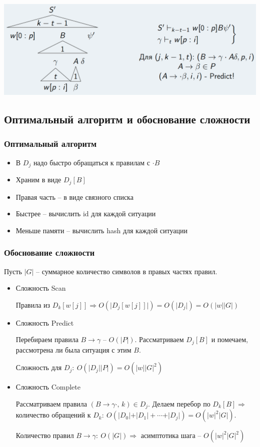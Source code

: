 \documentclass[a4paper,12pt]{article}
\theoremstyle{plain}
\theoremstyle{definition}
\theoremstyle{remark}
\begin{document}
\begin{itemize}
\begin{enumerate}
		            \includegraphics[scale=0.4]{assets/FullERli3.png}
	      \end{enumerate}
\end{itemize}

\subsection{Оптимальный алгоритм и обоснование сложности}
\subsubsection*{Оптимальный алгоритм}
\begin{itemize}
	\item В $D_j$ надо быстро обращаться к правилам с $\cdot B$
	\item Храним в виде $D_j[B]$
	\item Правая часть -- в виде связного списка
	\item Быстрее -- вычислить id для каждой ситуации
	\item Меньше памяти -- вычислить hash для каждой ситуации
\end{itemize}

\subsubsection*{Обоснование сложности}
Пусть $\vert G\vert$ -- суммарное количество символов в правых частях правил.

\begin{itemize}
	\item Сложность Scan

	      Правила из $D_k[w[j]] \Rightarrow O(\vert D_j[w[j]]\vert) = O(\vert D_j\vert) = O(\vert w\vert\vert G\vert)$

	\item Сложность Predict

	      Перебираем правила $B \to \gamma$ -- $O(\vert P\vert)$. Рассматриваем $D_j[B]$ и помечаем, рассмотрена ли была ситуация с этим $B$.

	      Сложность для $D_j :\: O(\vert D_j\vert\vert P\vert) = O(\vert w\vert\vert G\vert^2)$
	\item Сложность Complete

	      Рассматриваем правила $(B \to \gamma\cdot,\, k) \in D_j$. Делаем перебор по $D_k[B] \Rightarrow$ количество обращений к $D_k :\: O(\vert D_0\vert + \vert D_1\vert + \cdots + \vert D_j\vert) = O(\vert w\vert^2\vert G\vert)$.

	      Количество правил $B \to \gamma:\: O(\vert G\vert) \Rightarrow$ асимптотика шага -- $O(\vert w\vert^2\vert G\vert^2)$
\end{itemize}
\end{document}
